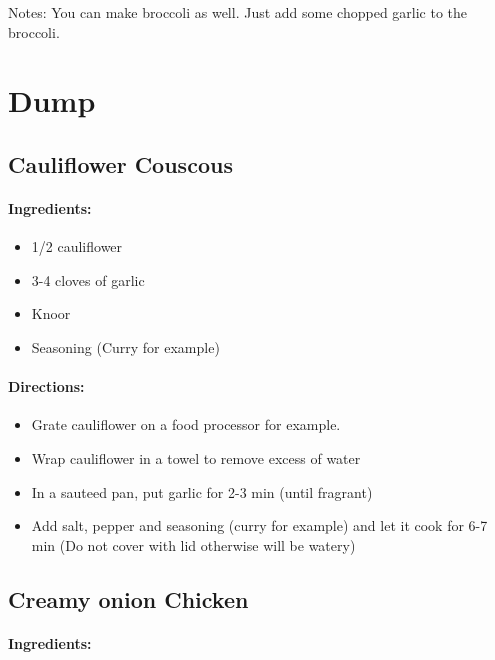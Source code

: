 \documentclass{article}
\begin{document}
Notes: You can make broccoli as well. Just add some chopped garlic to the broccoli.

\section{Dump}




\subsection{Cauliflower Couscous}

\paragraph{Ingredients:}

\begin{itemize}
	\item 1/2 cauliflower
	\item 3-4 cloves of garlic
	\item Knoor
	\item Seasoning (Curry for example)
\end{itemize}

\paragraph{Directions:}
\begin{itemize}
	\item Grate cauliflower on a food processor for example.
	\item Wrap cauliflower in a towel to remove excess of water
	\item In a sauteed pan, put garlic for 2-3 min (until fragrant)
	\item Add salt, pepper and seasoning (curry for example) and let it cook for 6-7 min (Do not cover with lid otherwise will be watery)
\end{itemize}

\subsection{Creamy onion Chicken}

\paragraph{Ingredients:}
\end{document}
